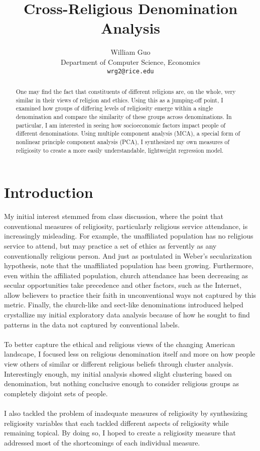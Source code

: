 \documentclass{article}
\title{Cross-Religious Denomination Analysis}
\author{
	William Guo\\
	Department of Computer Science, Economics \\
	\texttt{wrg2@rice.edu} \\
}
\begin{document}
	\maketitle
	
	\begin{abstract}
	One may find the fact that constituents of different religions are, on the whole, very similar in their views of religion and ethics. Using this as a jumping-off point, I examined how groups of differing levels of religiosity emerge within a single denomination and compare the similarity of these groups across denominations. In particular, I am interested in seeing how socioeconomic factors impact people of different denominations. Using multiple component analysis (MCA), a special form of nonlinear principle component analysis (PCA), I synthesized my own measures of religiosity to create a more easily understandable, lightweight regression model.
	\end{abstract}
	
	\section{Introduction}
	My initial interest stemmed from class discussion, where the point that conventional measures of religiosity, particularly religious service attendance, is increasingly misleading. For example, the unaffiliated population has no religious service to attend, but may practice a set of ethics as fervently as any conventionally religious person. And just as postulated in Weber's secularization hypothesis, \cite{inc_secularization} note that the unaffiliated population has been growing. Furthermore, even within the affiliated population, church attendance has been decreasing as secular opportunities take precedence and other factors, such as the Internet, allow believers to practice their faith in unconventional ways not captured by this metric. Finally, the church-like and sect-like denominations \cite{sects} introduced helped crystallize my initial exploratory data analysis because of how he sought to find patterns in the data not captured by conventional labels.
	\\
	\\
	To better capture the ethical and religious views of the changing American landscape, I focused less on religious denomination itself and more on how
	people view others of similar or different religious beliefs through cluster analysis. Interestingly enough, my initial analysis showed slight clustering based on denomination, but nothing conclusive enough to consider religious groups as completely disjoint sets of people.
	\\
	\\
	I also tackled the problem of inadequate measures of religiosity by synthesizing religiosity variables that each tackled different aspects of religiosity while remaining topical. By doing so, I hoped to create a religiosity measure that addressed most of the shortcomings of each individual measure.
	
\end{document}
